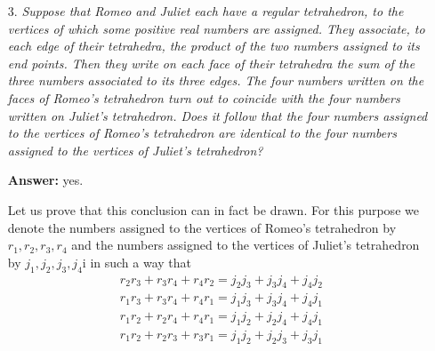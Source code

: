 \documentclass[a4paper, 12pt]{article}
\begin{document}
\begin{enumerate}
Note that the sequence given by $a_n = 16(2n - 1)$ is an arithmetic progression with constant difference $32$. Since $2n - 1$ is odd, the largest power of $2$ which divides $a_n$ is $16$. We recall that if
\[
	n = {p_1}^{a_1} {p_2}^{a_2} \cdots {p_k}^{a_k}
\]
then the number of divisors of $n$ is given by $(a_1 + 1)(a_2 + 2) \cdots (a_k + 1)$. It follows that the number of divisors of $a_n$ is divisible by $(4 + 1) = 5$.

To see that this sequence has the smallest possible positive common difference, consider the second term of the sequence. Its number of divisors is divisible by $5$, so the exponent of one of the primes in its prime factorisation is at least $4$. (Note that $5$ is a prime, so $(a_1 + 1)$ must be divisible by $5$ for one of the exponents $a_i$.) If this prime factor is at least $3$, then the second term is at least $3^4 = 81$ which is larger than $a_2 = 48$. We see that the prime with exponent at least $4$ must be $2$, and so the second term is divisible by $16$. If it is not a power of $2$, then it must be at least $16 \times 3 = 48 = a_2$, so any sequence with a smaller common difference must have a second term which is a power of $2$. But the number of its divisors must be a multiple of $5$, so the exponent is at least $10 - 1$, and $2^9 > 48$.

\qed


\vspace{5mm}
\item[3.]  \textit{Suppose that Romeo and Juliet each have a regular tetrahedron, to the vertices of which some positive real numbers are assigned. They associate, to each edge of their tetrahedra, the product of the two numbers assigned to its end points. Then they write on each face of their tetrahedra the sum of the three numbers associated to its three edges. The four numbers written on the faces of Romeo’s tetrahedron turn out to coincide with the four numbers written on Juliet’s tetrahedron. Does it follow that the four numbers assigned to the vertices of Romeo’s tetrahedron are identical to the four numbers assigned to the vertices of Juliet’s tetrahedron?}

\textbf{Answer:} yes.

Let us prove that this conclusion can in fact be drawn. For this purpose we denote the numbers assigned to the vertices of Romeo's tetrahedron by $r_1, r_2, r_3, r_4$ and the numbers assigned to the vertices of Juliet's tetrahedron by $j_1, j_2, j_3, j_4$i in such a way that
\begin{eqnarray}
	r_2 r_3 + r_3 r_4 + r_4 r_2 = j_2 j_3 + j_3 j_4 + j_4 j_2 \\
	r_1 r_3 + r_3 r_4 + r_4 r_1 = j_1 j_3 + j_3 j_4 + j_4 j_1 \\
	r_1 r_2 + r_2 r_4 + r_4 r_1 = j_1 j_2 + j_2 j_4 + j_4 j_1 \\
	r_1 r_2 + r_2 r_3 + r_3 r_1 = j_1 j_2 + j_2 j_3 + j_3 j_1
\end{eqnarray}


\end{enumerate}
\end{document}
